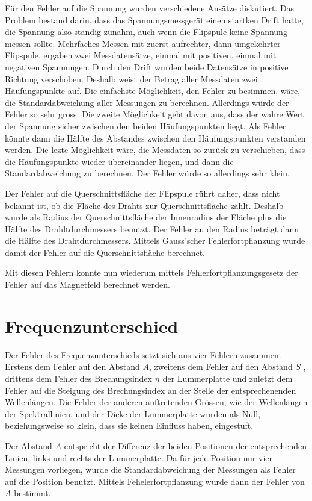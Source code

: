 \documentclass[a4paper,parskip,11pt, DIV12]{scrreprt}
\begin{document}
	Für den Fehler auf die Spannung wurden verschiedene Ansätze diskutiert. Das Problem bestand darin, dass das Spannungsmessgerät einen startken Drift hatte, die Spannung also ständig zunahm, auch wenn die Flipspule keine Spannung messen sollte. Mehrfaches Messen mit zuerst aufrechter, dann umgekehrter Flipspule, ergaben zwei Messdatensätze, einmal mit positiven, einmal mit negativen Spannungen. Durch den Drift wurden beide Datensätze in positive Richtung verschoben. Deshalb weist der Betrag aller Messdaten zwei Häufungspunkte auf. Die einfachste Möglichkeit, den Fehler zu besimmen, wäre, die Standardabweichung aller Messungen zu berechnen. Allerdings würde der Fehler so sehr gross. Die zweite Möglichkeit geht davon aus, dass der wahre Wert der Spannung sicher zwischen den beiden Häufungspunkten liegt. Als Fehler könnte dann die Hälfte des Abstandes zwischen den Häufungspunkten verstanden werden. Die lezte Möglichkeit wäre, die Messdaten so zurück zu verschieben, dass die Häufungspunkte wieder übereinander liegen, und dann die Standardabweichung zu berechnen. Der Fehler würde so allerdings sehr klein.
	
	Der Fehler auf die Querschnittsfläche der Flipspule rührt daher, dass nicht bekannt ist, ob die Fläche des Drahts zur Querschnittsfläche zählt. Deshalb wurde als Radius der Querschnittsfläche der Innenradius der Fläche plus die Hälfte des Drahltdurchmessers benutzt. Der Fehler au den Radius beträgt dann die Hälfte des Drahtdurchmessers. Mittels Gauss'scher Fehlerfortpflanzung wurde damit der Fehler auf die Querschnittsfläche berechnet. 
	
	Mit diesen Fehlern konnte nun wiederum mittels Fehlerfortpflanzungsgesetz der Fehler auf das Magnetfeld berechnet werden.
	 
	\section{Frequenzunterschied}
	Der Fehler des Frequenzunterschieds setzt sich aus vier Fehlern zusammen. Erstens dem Fehler auf den Abstand $A$, zweitens dem Fehler auf den Abstand $S$ , drittens dem Fehler des Brechungsindex $n$ der Lummerplatte und zuletzt dem Fehler auf die Steigung des Brechungsindex an der Stelle der entsprechenenden Wellenlängen. Die Fehler der anderen auftretenden Grössen, wie der Wellenlängen der Spektrallinien, und der Dicke der Lummerplatte wurden als Null, beziehungsweise so klein, dass sie keinen Einfluss haben, eingestuft. 
	
	Der Abstand $A$ entspricht der Differenz der beiden Positionen der entsprechenden Linien, links und rechts der Lummerplatte. Da für jede Position nur vier Messungen vorliegen, wurde die Standardabweichung der Messungen als Fehler auf die Position benutzt. Mittels Fehelerfortpflanzung wurde dann der Fehler von $A$ bestimmt.
	
\end{document}
